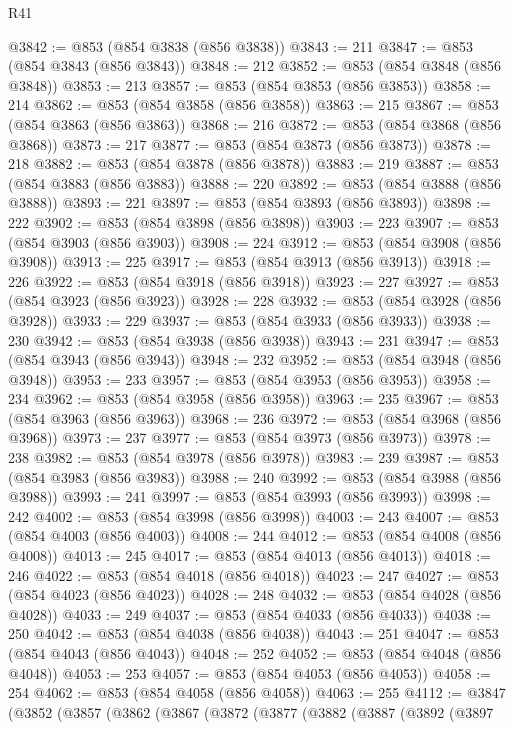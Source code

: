 \begin{lexlean}{R41}
\begin{coremodule}
@3842 := @853 (@854 @3838 (@856 @3838))
@3843 := 211
@3847 := @853 (@854 @3843 (@856 @3843))
@3848 := 212
@3852 := @853 (@854 @3848 (@856 @3848))
@3853 := 213
@3857 := @853 (@854 @3853 (@856 @3853))
@3858 := 214
@3862 := @853 (@854 @3858 (@856 @3858))
@3863 := 215
@3867 := @853 (@854 @3863 (@856 @3863))
@3868 := 216
@3872 := @853 (@854 @3868 (@856 @3868))
@3873 := 217
@3877 := @853 (@854 @3873 (@856 @3873))
@3878 := 218
@3882 := @853 (@854 @3878 (@856 @3878))
@3883 := 219
@3887 := @853 (@854 @3883 (@856 @3883))
@3888 := 220
@3892 := @853 (@854 @3888 (@856 @3888))
@3893 := 221
@3897 := @853 (@854 @3893 (@856 @3893))
@3898 := 222
@3902 := @853 (@854 @3898 (@856 @3898))
@3903 := 223
@3907 := @853 (@854 @3903 (@856 @3903))
@3908 := 224
@3912 := @853 (@854 @3908 (@856 @3908))
@3913 := 225
@3917 := @853 (@854 @3913 (@856 @3913))
@3918 := 226
@3922 := @853 (@854 @3918 (@856 @3918))
@3923 := 227
@3927 := @853 (@854 @3923 (@856 @3923))
@3928 := 228
@3932 := @853 (@854 @3928 (@856 @3928))
@3933 := 229
@3937 := @853 (@854 @3933 (@856 @3933))
@3938 := 230
@3942 := @853 (@854 @3938 (@856 @3938))
@3943 := 231
@3947 := @853 (@854 @3943 (@856 @3943))
@3948 := 232
@3952 := @853 (@854 @3948 (@856 @3948))
@3953 := 233
@3957 := @853 (@854 @3953 (@856 @3953))
@3958 := 234
@3962 := @853 (@854 @3958 (@856 @3958))
@3963 := 235
@3967 := @853 (@854 @3963 (@856 @3963))
@3968 := 236
@3972 := @853 (@854 @3968 (@856 @3968))
@3973 := 237
@3977 := @853 (@854 @3973 (@856 @3973))
@3978 := 238
@3982 := @853 (@854 @3978 (@856 @3978))
@3983 := 239
@3987 := @853 (@854 @3983 (@856 @3983))
@3988 := 240
@3992 := @853 (@854 @3988 (@856 @3988))
@3993 := 241
@3997 := @853 (@854 @3993 (@856 @3993))
@3998 := 242
@4002 := @853 (@854 @3998 (@856 @3998))
@4003 := 243
@4007 := @853 (@854 @4003 (@856 @4003))
@4008 := 244
@4012 := @853 (@854 @4008 (@856 @4008))
@4013 := 245
@4017 := @853 (@854 @4013 (@856 @4013))
@4018 := 246
@4022 := @853 (@854 @4018 (@856 @4018))
@4023 := 247
@4027 := @853 (@854 @4023 (@856 @4023))
@4028 := 248
@4032 := @853 (@854 @4028 (@856 @4028))
@4033 := 249
@4037 := @853 (@854 @4033 (@856 @4033))
@4038 := 250
@4042 := @853 (@854 @4038 (@856 @4038))
@4043 := 251
@4047 := @853 (@854 @4043 (@856 @4043))
@4048 := 252
@4052 := @853 (@854 @4048 (@856 @4048))
@4053 := 253
@4057 := @853 (@854 @4053 (@856 @4053))
@4058 := 254
@4062 := @853 (@854 @4058 (@856 @4058))
@4063 := 255
@4112 := @3847
    (@3852
      (@3857
        (@3862
          (@3867
            (@3872
              (@3877
                (@3882
                  (@3887
                    (@3892
                      (@3897

\end{coremodule}
\end{lexlean}

